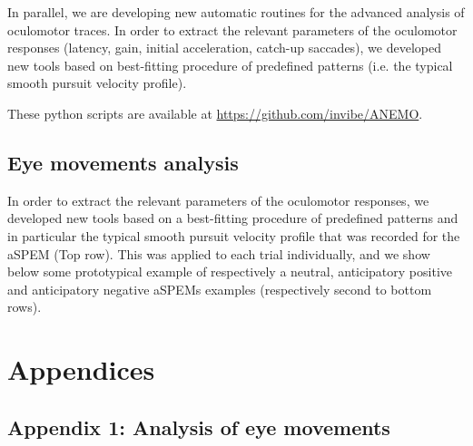 \documentclass[12pt,english]{article}%
\begin{document}

In parallel, we are developing new automatic routines for the advanced analysis of oculomotor traces. In order to extract the relevant parameters of the oculomotor responses (latency, gain, initial acceleration, catch-up saccades), we developed new tools based on best-fitting procedure of predefined patterns (i.e. the typical smooth pursuit velocity profile).

These python scripts are available at \url{https://github.com/invibe/ANEMO}.


\subsection{Eye movements analysis}

In order to extract the relevant parameters of the oculomotor responses, we developed new tools based on a best-fitting procedure of predefined patterns and in particular the typical smooth pursuit velocity profile that was recorded for the aSPEM (Top row). This was applied to each trial individually, and we show below some prototypical example of respectively a neutral, anticipatory positive and anticipatory negative aSPEMs examples (respectively second to bottom rows).
\section{Appendices}
\subsection{Appendix 1: Analysis of eye movements}
\label{app:em}
\end{document}
